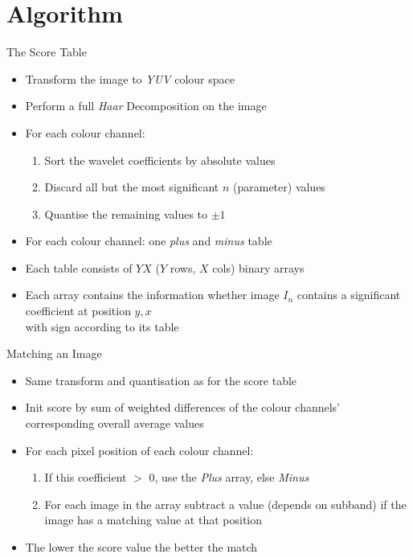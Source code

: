 \documentclass{beamer}
\begin{document}
\section{Algorithm}

\begin{frame}{The Score Table}

  \begin{itemize}
  \item Transform the image to \emph{YUV} colour space
  \item Perform a full \emph{Haar} Decomposition on the image
  \item For each colour channel:
    \begin{enumerate}
    \item Sort the wavelet coefficients by absolute values
    \item Discard all but the most significant $n$ (parameter) values
    \item Quantise the remaining values to $\pm 1$
    \end{enumerate}
  \end{itemize}

  \pause
  \begin{itemize}
  \item For each colour channel: one \emph{plus} and \emph{minus}
    table
  \item Each table consists of $YX$ ($Y$ rows, $X$ cols) binary arrays 
  \item Each array contains the information whether image $I_n$ contains
    a significant coefficient at position $y, x$\\
    with sign according to its table
  \end{itemize}

\end{frame}

\begin{frame}{Matching an Image}

  \begin{itemize}
  \item Same transform and quantisation as for the score table
  \item Init score by sum of weighted differences of the colour channels'
    corresponding overall average values
  \item For each pixel position of each colour channel:
    \begin{enumerate}
    \item If this coefficient $>$ 0, use the \emph{Plus} array,
      else \emph{Minus}
    \item For each image in the array subtract a value (depends on
      subband) if the image has a matching value at that position
    \end{enumerate}
  \item The lower the score value the better the match
  \end{itemize}

\end{frame}
\end{document}
